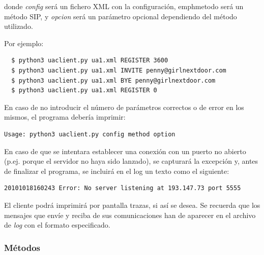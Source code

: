 \documentclass[a4paper,11pt]{article}
\begin{document}
donde \emph{config} será un fichero XML con la configuración,
emph{metodo} será un método SIP, y \emph{opcion} será un parámetro
opcional dependiendo del método utilizado.

Por ejemplo:
\begin{verbatim}
  $ python3 uaclient.py ua1.xml REGISTER 3600
  $ python3 uaclient.py ua1.xml INVITE penny@girlnextdoor.com
  $ python3 uaclient.py ua1.xml BYE penny@girlnextdoor.com
  $ python3 uaclient.py ua1.xml REGISTER 0
\end{verbatim}

En caso de no introducir el número de parámetros correctos o de error en los mismos, el programa debería imprimir:
\begin{verbatim}
Usage: python3 uaclient.py config method option
\end{verbatim}

En caso de que se intentara establecer una conexión con un puerto no abierto
(p.ej. porque el servidor no haya sido lanzado), se capturará la excepción y, antes de finalizar el programa, se incluirá en el log un texto como el siguiente:
\begin{verbatim}
20101018160243 Error: No server listening at 193.147.73 port 5555
\end{verbatim}

El cliente podrá imprimirá por pantalla trazas, si así se desea. Se recuerda que 
los mensajes que envíe y reciba de sus comunicaciones han de aparecer
en el archivo de \emph{log} con el formato especificado.

\subsubsection{Métodos}
\end{document}
